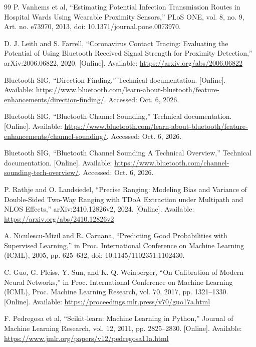 \documentclass[12pt,a4paper]{report}
\begin{document}
\clearpage\pagestyle{plain}
\renewcommand{\bibname}{References}
\begin{thebibliography}{99}
 P. Vanhems et al, ``Estimating Potential Infection Transmission Routes in Hospital Wards Using Wearable Proximity Sensors,'' PLoS ONE, vol. 8, no. 9, Art. no. e73970, 2013, doi: 10.1371/journal.pone.0073970.

 D. J. Leith and S. Farrell, ``Coronavirus Contact Tracing: Evaluating the Potential of Using Bluetooth Received Signal Strength for Proximity Detection,'' arXiv:2006.06822, 2020. [Online]. Available: \url{https://arxiv.org/abs/2006.06822}

 Bluetooth SIG, ``Direction Finding,'' Technical documentation. [Online]. Available: \url{https://www.bluetooth.com/learn-about-bluetooth/feature-enhancements/direction-finding/}. Accessed: Oct. 6, 2026.

 Bluetooth SIG, ``Bluetooth Channel Sounding,'' Technical documentation. [Online]. Available: \url{https://www.bluetooth.com/learn-about-bluetooth/feature-enhancements/channel-sounding/}. Accessed: Oct. 6, 2026.

 Bluetooth SIG, ``Bluetooth Channel Sounding A Technical Overview,'' Technical documentation. [Online]. Available: \url{https://www.bluetooth.com/channel-sounding-tech-overview/}. Accessed: Oct. 6, 2026.

 P. Rathje and O. Landsiedel, ``Precise Ranging: Modeling Bias and Variance of Double-Sided Two-Way Ranging with TDoA Extraction under Multipath and NLOS Effects,'' arXiv:2410.12826v2, 2024. [Online]. Available: \url{https://arxiv.org/abs/2410.12826v2}

 A. Niculescu-Mizil and R. Caruana, ``Predicting Good Probabilities with Supervised Learning,'' in Proc. International Conference on Machine Learning (ICML), 2005, pp. 625--632, doi: 10.1145/1102351.1102430.

 C. Guo, G. Pleiss, Y. Sun, and K. Q. Weinberger, ``On Calibration of Modern Neural Networks,'' in Proc. International Conference on Machine Learning (ICML), Proc. Machine Learning Research, vol. 70, 2017, pp. 1321--1330. [Online]. Available: \url{https://proceedings.mlr.press/v70/guo17a.html}

 F. Pedregosa et al, ``Scikit-learn: Machine Learning in Python,'' Journal of Machine Learning Research, vol. 12, 2011, pp. 2825--2830. [Online]. Available: \url{https://www.jmlr.org/papers/v12/pedregosa11a.html}


\end{thebibliography}
\end{document}
